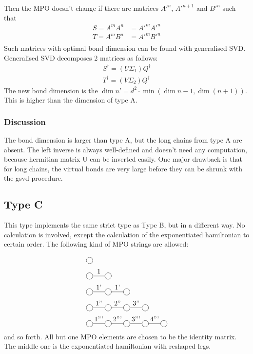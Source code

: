 Then the MPO doesn't change if there are matrices $A'^{n}$, $A'^{n+1}$ and $B'^{n}$ such that
\begin{equation}
    \begin{split}
        S=A^{m} A^{n} &= A'^{m} A'^{n} \\
        T=A^{m} B^{n} &= A'^{m} B'^{n} \\
    \end{split}
\end{equation}
Such matrices with optimal bond dimension can be found with generalised SVD. Generalised SVD decomposes 2 matrices as follows:
\begin{equation}
    \begin{split}
        S^{\dagger} = (U \Sigma_1) Q^{\dagger} \\
        T^{\dagger} = (V \Sigma_2) Q^{\dagger}
    \end{split}
\end{equation}
The new bond dimension is the $\dim{n'} =d^2 \cdot \min( \dim{n-1}, \dim (n+1) )$.  This is higher than the dimension of type A.

\subsubsection{Discussion}
The bond dimension is larger than type A, but the long chains from type A are absent. The left inverse is always well-defined and doesn't need any computation, because hermitian matrix U can be inverted easily. One major drawback is that for long chains, the virtual bonds are very large before they can be shrunk with the gsvd procedure.

\subsection{Type C}

This type implements the same strict type as Type B, but in a different way. No calculation is involved, except the calculation of the exponentiated hamiltonian to certain order. The following kind of MPO strings are allowed:

\begin{equation}
    \begin{split}
        &\mpob{1}{ {,}  }{}{}{}{{,,}} \\
        &\mpob{2}{ {,"1",}  }{}{}{}{{,,}}\\
        &\mpob{3}{ {,"1'","1'",}  }{}{}{}{{,,,}}\\
        &\mpob{4}{ {,"1''","2''","3''",}  }{}{}{}{{,,,,,}}\\
        &\mpob{5}{ {,"1'''","2'''","3'''","4'''",}  }{}{}{}{{,,,,,}}\\
    \end{split}
\end{equation}
and so forth. All but one MPO elements are chosen to be the identity matrix. The middle one is the exponentiated hamiltonian with reshaped legs.

